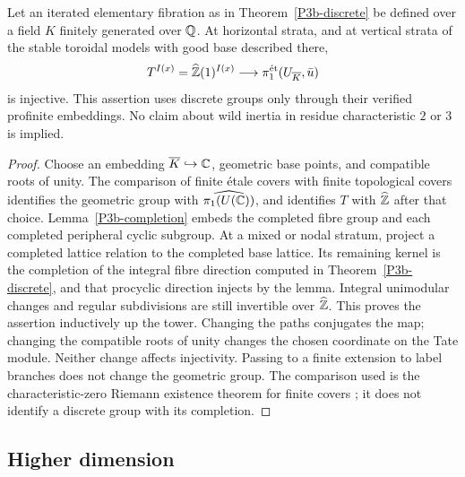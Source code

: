 \begin{corollary}\label{P3b-profinite}
Let an iterated elementary fibration as in Theorem~\ref{P3b-discrete} be defined
over a field $K$ finitely generated over $\mathbb Q$.  At horizontal strata, and at
vertical strata of the stable toroidal models with good base described there,
\[
 T^{I(x)}=\widehat{\mathbb Z}(1)^{I(x)}\longrightarrow\pi_1^{\mathrm{\acute et}}
 (U_{\overline K},\bar u)
\]
is injective.  This assertion uses discrete groups only through their verified
profinite embeddings.  No claim about wild inertia in residue characteristic
$2$ or $3$ is implied.
\end{corollary}
\begin{proof}
Choose an embedding $\overline K\hookrightarrow\mathbb C$, geometric base points,
and compatible roots of unity.  The comparison of finite \'etale covers with
finite topological covers identifies the geometric group with
$\widehat{\pi_1(U(\mathbb C))}$, and identifies $T$ with $\widehat{\mathbb Z}$ after that
choice.  Lemma~\ref{P3b-completion} embeds the completed fibre group and each
completed peripheral cyclic subgroup.  At a mixed or nodal stratum, project
a completed lattice relation to the completed base lattice.  Its remaining
kernel is the completion of the integral fibre direction computed in
Theorem~\ref{P3b-discrete}, and that procyclic direction injects by the lemma.
Integral unimodular changes and regular subdivisions are still invertible
over $\widehat{\mathbb Z}$.  This proves the assertion inductively up the tower.
Changing the paths conjugates the map; changing the compatible roots of unity
changes the chosen coordinate on the Tate module.  Neither change affects
injectivity.  Passing to a finite extension to label branches does not change
the geometric group.  The comparison used is the characteristic-zero
Riemann existence theorem for finite covers \citep[Expos\'e XII, Theorem 5.1 and Corollary 5.2]{SGA1}; it does not identify a discrete
group with its completion.
\end{proof}

\subsection{Higher dimension}

